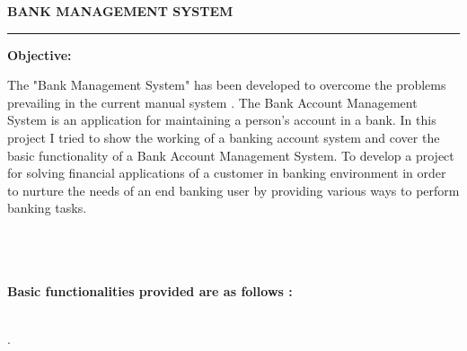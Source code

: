 \documentclass[11pt, a4paper]{article}
\begin{document}
\begin{center}
    \textbf{\Huge{BANK MANAGEMENT SYSTEM}}
\end{center} 
\hrule
\vspace{1cm}
\begin{left}
    \textbf{\LARGE{Objective:}}
    
\end{left}
\vspace{0.7cm}
\large{The "Bank Management System" has been developed to overcome the problems prevailing in the current manual system . The Bank Account Management System is an application for maintaining a person's account in  a  bank.  In  this  project  I  tried  to  show  the  working  of  a  banking  account  system  and cover the basic functionality of a Bank Account Management System. To develop a project for solving financial applications of a customer in banking environment in order to nurture the needs of  an end banking user by providing various ways to perform banking tasks.
\\\\\\\\}
\vspace{1.2cm}
\begin{left}
    \textbf{\LARGE{Basic functionalities provided are as follows :}}
\end{left}
\\
\newline
 .\\\\
\\
\end{document}
